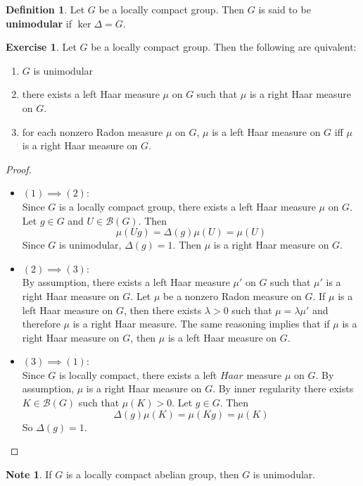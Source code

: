 \documentclass{book}
\theoremstyle{definition}
\newtheorem{defn}[definition]{Definition}
\newtheorem{note}[definition]{Note}
\newtheorem{ex}[definition]{Exercise}
\newcommand{\lam}{\lambda}
\newcommand{\Del}{\Delta}
\newcommand{\MB}{\mathcal{B}}
\newcommand{\lex}[1]{\label{ex:#1}}
\newcommand{\ld}[1]{\label{defn:#1}}
\DeclareMathOperator*{\0}{\mbf{0}}
\DeclareMathOperator*{\1}{\mbf{1}}
\begin{document}
	\begin{defn} \ld{00000} 
		Let $G$ be a locally compact group. Then $G$ is said to be \textbf{unimodular} if $\ker \Del = G$.  
	\end{defn}
	
	\begin{ex} \lex{00000} 
		Let $G$ be a locally compact group. Then the following are quivalent: 
		\begin{enumerate}
			\item $G$ is unimodular 
			\item there exists a left  Haar measure $\mu$ on $G$ such that $\mu$ is a right Haar measure on $G$.
			\item for each nonzero Radon measure $\mu$ on $G$, $\mu$ is a left Haar measure on $G$ iff $\mu$ is a right Haar measure on $G$.
		\end{enumerate}
	\end{ex}
	
	\begin{proof}\
		\begin{itemize}
			\item $(1) \implies (2)$:\\ Since $G$ is a locally compact group, there exists a left Haar measure $\mu$ on $G$. Let $g \in G$ and $U \in \MB(G)$. Then $$\mu(Ug) = \Del(g) \mu(U) = \mu(U)$$ Since $G$ is unimodular, $\Del(g) = 1$. Then $\mu$ is a right Haar measure on $G$. 
			\item $(2) \implies (3)$:\\ By assumption, there exists a left  Haar measure $\mu'$ on $G$ such that $\mu'$ is a right Haar measure on $G$. Let $\mu$ be a nonzero Radon measure on $G$. If $\mu$ is a left Haar measure on $G$, then there exists $\lam >0$ such that $\mu = \lam \mu'$ and therefore $\mu$ is a right Haar measure. The same reasoning implies that if $\mu$ is a right Haar measure on $G$, then $\mu$ is a left Haar measure on $G$.
			\item $(3) \implies (1)$: \\ Since $G$ is locally compact, there exists a left $Haar$ measure $\mu$ on $G$. By assumption, $\mu$ is a right Haar measure on $G$. By inner regularity there exists $K \in \MB(G)$ such that $\mu(K) > 0$. Let $g \in G$. Then $$\Del(g) \mu(K) = \mu(Kg) = \mu(K)$$ So $\Del(g) = 1$.
		\end{itemize}
	\end{proof}

	\begin{note}
		If $G$ is a locally compact abelian group, then $G$ is unimodular.
	\end{note}
	
\end{document}
